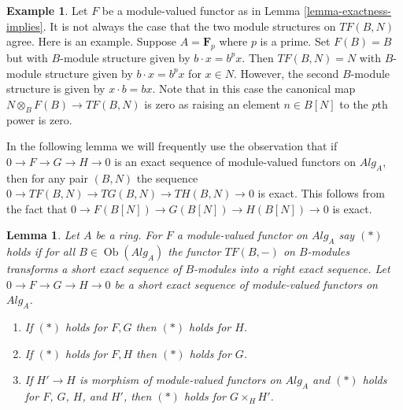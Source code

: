 \documentclass{stacks-project}
\theoremstyle{plain}
\newtheorem{lemma}[subsection]{Lemma}
\theoremstyle{definition}
\newtheorem{example}[subsection]{Example}
\theoremstyle{remark}
\numberwithin{equation}{subsection}
\def\Ob{\mathop{\mathrm{Ob}}\nolimits}
\begin{document}
\begin{example}
\label{example-module-structure-different}
Let $F$ be a module-valued functor as in
Lemma \ref{lemma-exactness-implies}.
It is not always the case that the two module structures on
$TF(B, N)$ agree. Here is an example. Suppose $A = \mathbf{F}_p$
where $p$ is a prime. Set $F(B) = B$ but with $B$-module structure
given by $b \cdot x = b^px$. Then $TF(B, N) = N$ with $B$-module structure
given by $b \cdot x = b^px$ for $x \in N$. However, the second $B$-module
structure is given by $x \cdot b = bx$. Note that in this case the canonical
map $N \otimes_B F(B) \to TF(B, N)$ is zero as raising an element
$n \in B[N]$ to the $p$th power is zero.
\end{example}

\noindent
In the following lemma we will frequently use the observation that
if $0 \to F \to G \to H \to 0$ is an exact sequence of module-valued
functors on $\textit{Alg}_A$, then for any pair $(B, N)$ the
sequence $0 \to TF(B, N) \to TG(B, N) \to TH(B, N) \to 0$ is exact.
This follows from the fact that $0 \to F(B[N]) \to G(B[N]) \to H(B[N]) \to 0$
is exact.

\begin{lemma}
\label{lemma-exactness-permanence}
Let $A$ be a ring. For $F$ a module-valued functor on $\textit{Alg}_A$
say $(*)$ holds if for all $B \in \Ob(\textit{Alg}_A)$ the
functor $TF(B, -)$ on $B$-modules transforms a short exact sequence
of $B$-modules into a right exact sequence. Let
$0 \to F \to G \to H \to 0$ be a short exact sequence of
module-valued functors on $\textit{Alg}_A$.
\begin{enumerate}
\item If $(*)$ holds for $F, G$ then $(*)$ holds for $H$.
\item If $(*)$ holds for $F, H$ then $(*)$ holds for $G$.
\item If $H' \to H$ is morphism of module-valued functors on $\textit{Alg}_A$
and $(*)$ holds for $F$, $G$, $H$, and $H'$, then $(*)$ holds for
$G \times_H H'$.
\end{enumerate}
\end{lemma}
\end{document}
